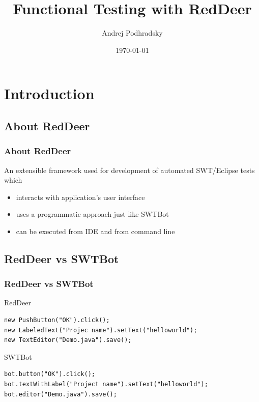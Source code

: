 \documentclass{beamer}
\begin{document}
\title{Functional Testing with RedDeer}   
\author{Andrej Podhradsky}
\date{\today} 



\frame{\titlepage} 


\section{Introduction}

\subsection{About RedDeer}
\begin{frame}[fragile]
\frametitle{About RedDeer}
An extensible framework used for development of automated SWT/Eclipse tests which
\begin{itemize}
\item interacts with application’s user interface
\item uses a programmatic approach just like SWTBot
\item can be executed from IDE and from command line
\end{itemize}
\end{frame}

\subsection{RedDeer vs SWTBot}
\begin{frame}[fragile]
\frametitle{RedDeer vs SWTBot}
RedDeer  
\begin{lstlisting}
new PushButton("OK").click();
new LabeledText("Projec name").setText("helloworld");
new TextEditor("Demo.java").save();
\end{lstlisting}
\vspace{0.5cm}
SWTBot
\begin{lstlisting}
bot.button("OK").click();
bot.textWithLabel("Project name").setText("helloworld");
bot.editor("Demo.java").save();
\end{lstlisting}
\end{frame}
\end{document}
